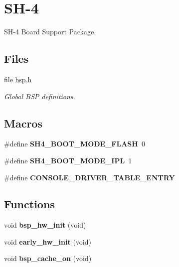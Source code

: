 \hypertarget{group__RTEMSBSPsSH4}{}\section{S\+H-\/4}
\label{group__RTEMSBSPsSH4}


S\+H-\/4 Board Support Package.  


\subsection*{Files}
\begin{DoxyCompactItemize}
\item 
file \mbox{\hyperlink{bsps_2sh_2gensh4_2include_2bsp_8h}{bsp.\+h}}
\begin{DoxyCompactList}\small\item\em Global B\+SP definitions. \end{DoxyCompactList}\end{DoxyCompactItemize}
\subsection*{Macros}
\begin{DoxyCompactItemize}
\item 
\mbox{\label{group__RTEMSBSPsSH4_ga134402e02c91151404f12e16730ef1d4}} 
\#define {\bfseries S\+H4\+\_\+\+B\+O\+O\+T\+\_\+\+M\+O\+D\+E\+\_\+\+F\+L\+A\+SH}~0
\item 
\mbox{\label{group__RTEMSBSPsSH4_gadb21dc1894932f4a5082d53a6cc17990}} 
\#define {\bfseries S\+H4\+\_\+\+B\+O\+O\+T\+\_\+\+M\+O\+D\+E\+\_\+\+I\+PL}~1
\item 
\#define {\bfseries C\+O\+N\+S\+O\+L\+E\+\_\+\+D\+R\+I\+V\+E\+R\+\_\+\+T\+A\+B\+L\+E\+\_\+\+E\+N\+T\+RY}
\end{DoxyCompactItemize}
\subsection*{Functions}
\begin{DoxyCompactItemize}
\item 
\mbox{\label{group__RTEMSBSPsSH4_gad645179cbf4b50dedeb57bc691cb548f}} 
void {\bfseries bsp\+\_\+hw\+\_\+init} (void)
\item 
\mbox{\label{group__RTEMSBSPsSH4_ga583a924d59f173f2b5abf39ae3adf7ab}} 
void {\bfseries early\+\_\+hw\+\_\+init} (void)
\item 
\mbox{\label{group__RTEMSBSPsSH4_ga978874b3ce172a195180547e7fa37bbe}} 
void {\bfseries bsp\+\_\+cache\+\_\+on} (void)
\end{DoxyCompactItemize}
